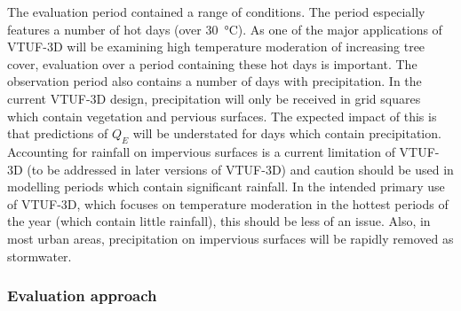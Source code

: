 \documentclass[final,3p,times,authoryear]{elsarticle}
\begin{document}
The evaluation period contained a range of conditions. The period especially features a number of hot days (over \SI{30}{\degreeCelsius}). As one of the major applications of VTUF-3D will be examining high temperature moderation of increasing tree cover, evaluation over a period containing these hot days is important. The observation period also contains a number of days with precipitation. In the current VTUF-3D design, precipitation will only be received in grid squares which contain vegetation and pervious surfaces. The expected impact of this is that predictions of $Q_{E}$ will be understated for days which contain precipitation. Accounting for rainfall on impervious surfaces is a current limitation of VTUF-3D (to be addressed in later versions of VTUF-3D) and caution should be used in modelling periods which contain significant rainfall. In the intended primary use of VTUF-3D, which focuses on temperature moderation in the hottest periods of the year (which contain little rainfall), this should be less of an issue. Also, in most urban areas, precipitation on impervious surfaces will be rapidly removed as stormwater.

\subsubsection{Evaluation approach}\label{sec:prvalresults}
\end{document}
